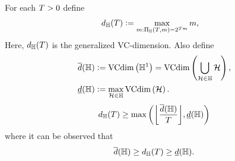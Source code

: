 \begin{definition}
For each $T > 0$ define
\begin{align}
    d_{\mathbb{H}}(T) &\vcentcolon= \max_{m: \Pi_{\mathbb{H}}(T, m) = 2^{T m}} m , \nonumber 
\end{align}
Here, $d_{\mathbb{H}}(T)$ is the generalized VC-dimension.
Also define
\begin{align}
    \overline{d}(\mathbb{H}) &\vcentcolon= \text{VCdim}\left(\mathbb{H}^1\right) = \text{VCdim}\left(\bigcup_{\mathcal{H} \in \mathbb{H}} \mathcal{H}\right)  ,  \nonumber \\
    \underline{d}(\mathbb{H}) &\vcentcolon= \max_{\mathcal{H} \in \mathbb{H}} \text{VCdim}\left(\mathcal{H}\right)  . \nonumber
\end{align}
\begin{equation}
    \nonumber
    d_\hypspacef(\ntasks) \geq \max\left(\floor*{\frac{\overline{d}(\hypspacef)}{\ntasks}}, \underline{d}(\hypspacef) \right)
\end{equation}
where it can be observed that 
\begin{equation}
    \label{eq:genvc_inequalities}
    \overline{d}(\hypspacef) \geq  d_\hypspacef(\ntasks)\geq \underline{d}(\hypspacef).
\end{equation}

\end{definition}
